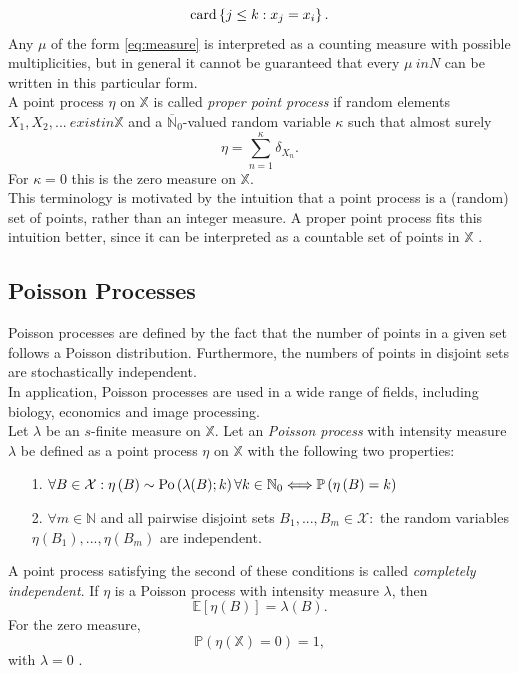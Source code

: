\begin{equation*}
    \hbox{card}\left\lbrace j\leq k:x_j=x_i\right\rbrace.
\end{equation*}
Any $\mu$ of the form \eqref{eq:measure} is interpreted as a counting measure with possible multiplicities, but in general it cannot be guaranteed that every $\mu\ in N$ can be written in this particular form. \\
A point process $\eta$ on $\mathbb{X}$ is called \textit{proper point process} if random elements $X_1,X_2,...\ exist in \mathbb{X}$ and a $\overline{\mathbb{N}}_0$-valued random variable $\kappa$ such that almost surely
\begin{equation}
    \eta=\sum_{n=1}^{\kappa}\delta_{X_n}.
\end{equation}
For $\kappa=0$ this is the zero measure on $\mathbb{X}$. \\
This terminology is motivated by the intuition that a point process is a (random) set of points, rather than an integer measure. A proper point process fits this intuition better, since it can be interpreted as a countable set of points in $\mathbb{X}$ \autocite[][9--12]{last2017lectures}.
\subsection{Poisson Processes}
Poisson processes are defined by the fact that the number of points in a given set follows a Poisson distribution. Furthermore, the numbers of points in disjoint sets are stochastically independent. \\
In application, Poisson processes are used in a wide range of fields, including biology, economics and image processing. \\
Let $\lambda$ be an $s$-finite measure on $\mathbb{X}$. Let an \textit{Poisson process} with intensity measure $\lambda$ be defined as a point process $\eta$ on $\mathbb{X}$ with the following two properties:
\begin{itemize}
    \item[1.] $\forall B\in\mathcal{X}: \eta\left(B\right)\sim\hbox{Po}\left(\lambda(B);k\right)\forall k\in\mathbb{N}_0 \Longleftrightarrow \mathbb{P}\left(\eta\left(B\right)=k\right)$
    \item[2.] 
    $\forall m\in\mathbb{N}$ and all pairwise disjoint sets $B_1,...,B_m\in\mathcal{X}:$ the random variables $\eta\left(B_1\right),...,\eta\left(B_m\right)$ are independent.
\end{itemize}
A point process satisfying the second of these conditions is called \textit{completely independent}. If $\eta$ is a Poisson process with intensity measure $\lambda$, then
\begin{equation}
    \mathbb{E}\left[\eta\left(B\right)\right]=\lambda(B).
\end{equation}
For the zero measure,
\begin{equation*}
    \mathbb{P}\left(\eta(\mathbb{X})=0\right)=1,
\end{equation*}
with $\lambda=0$ \autocite[][19]{last2017lectures}.

